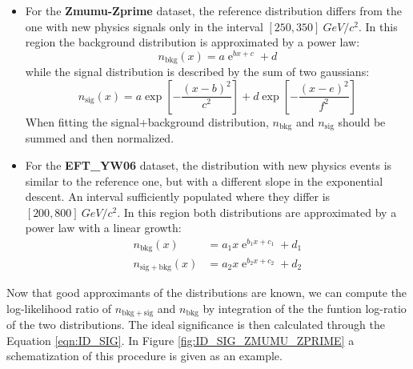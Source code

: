 \begin{itemize}
	\item For the \textbf{Zmumu-Zprime} dataset, the reference distribution differs from the one with new physics signals only in the interval $[250,350]~\si{GeV/c^2}$. In this region the background distribution is approximated by a power law:
	\begin{equation}
		n_\mathrm{bkg}(x) = a\operatorname{e}^{bx + c} + d
	\end{equation}
	while the signal distribution is described by the sum of two gaussians:
	\begin{equation}
		n_\mathrm{sig}(x) = a\exp{\left[-\frac{(x-b)^2}{c^2}\right]} 
		+ d\exp{\left[-\frac{(x-e)^2}{f^2}\right]}
	\end{equation}
	When fitting the signal+background distribution, $n_\mathrm{bkg}$ and $n_\mathrm{sig}$ should be summed and then normalized.
	
	\item For the \textbf{EFT\_YW06} dataset, the distribution with new physics events is similar to the reference one, but with a different slope in the exponential descent. An interval sufficiently populated where they differ is $[200,800]~\si{GeV/c^2}$. In this region both distributions are approximated by a power law with a linear growth:
	\begin{align}
		n_\mathrm{bkg}(x) &= a_{1}x\operatorname{e}^{b_{1}x + c_{1}} + d_{1}	\\
		n_\mathrm{sig+bkg}(x) &= a_{2}x\operatorname{e}^{b_{2}x + c_{2}} + d_{2}
	\end{align}
\end{itemize}

Now that good approximants of the distributions are known, we can compute the log-likelihood ratio of $n_\mathrm{bkg+sig}$ and $n_\mathrm{bkg}$ by integration of the the funtion log-ratio of the two distributions. The ideal significance is then calculated through the Equation \ref{eqn:ID_SIG}. In Figure \ref{fig:ID_SIG_ZMUMU_ZPRIME} a schematization of this procedure is given as an example.

